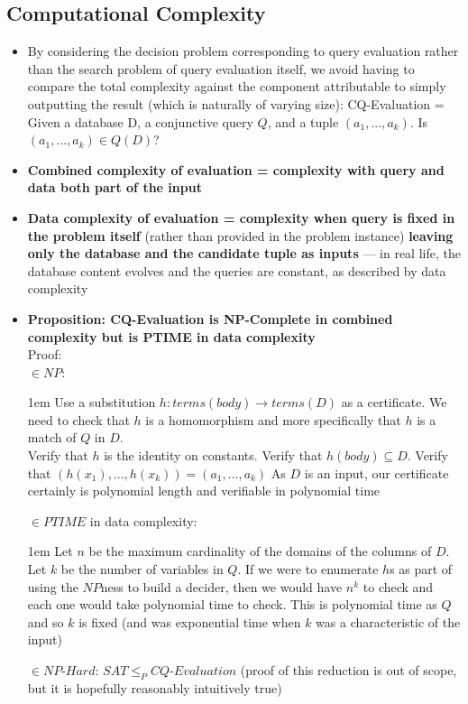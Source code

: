 \documentclass[20pt,a4paper,landscape]{extarticle}
\begin{document}
\begin{flushleft}
\subsection{Computational Complexity}
\begin{itemize}
\item By considering the decision problem corresponding to query evaluation rather than the search problem of query evaluation itself, we avoid having to compare the total complexity against the component attributable to simply outputting the result (which is naturally of varying size): CQ-Evaluation = Given a database D, a conjunctive query $Q$, and a tuple $(a_1, ..., a_k)$. Is $(a_1, ..., a_k) \in Q(D)$?
\item \textbf{Combined complexity of evaluation = complexity with query and data both part of the input}
\item \textbf{Data complexity of evaluation = complexity when query is fixed in the problem itself} (rather than provided in the problem instance) \textbf{leaving only the database and the candidate tuple as inputs} --- in real life, the database content evolves and the queries are constant, as described by data complexity
\item \textbf{Proposition: CQ-Evaluation is NP-Complete in combined complexity but is PTIME in data complexity}\\
Proof:\\
$\in NP$:
\begin{adjustwidth}{1em}{}
Use a substitution $h: terms(body) \to terms(D)$ as a certificate. We need to check that $h$ is a homomorphism and more specifically that $h$ is a match of $Q$ in $D$.\\
Verify that $h$ is the identity on constants. Verify that $h(body) \subseteq D$. Verify that $(h(x_1), ..., h(x_k)) = (a_1, ..., a_k)$
As $D$ is an input, our certificate certainly is polynomial length and verifiable in polynomial time
\end{adjustwidth}
$\in PTIME$ in data complexity:
\begin{adjustwidth}{1em}{}
Let $n$ be the maximum cardinality of the domains of the columns of $D$. Let $k$ be the number of variables in $Q$. If we were to enumerate $h$s as part of using the $NP$ness to build a decider, then we would have $n^k$ to check and each one would take polynomial time to check. This is polynomial time as $Q$ and so $k$ is fixed (and was exponential time when $k$ was a characteristic of the input)
\end{adjustwidth}
$\in NP\mbox{-}Hard$: $SAT \leq_P CQ\mbox{-}Evaluation$ (proof of this reduction is out of scope, but it is hopefully reasonably intuitively true)

\end{itemize}
\end{flushleft}
\end{document}
